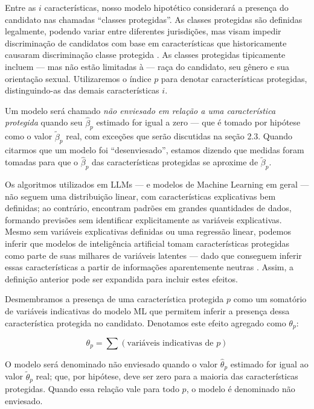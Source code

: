\documentclass[12pt,a4paper]{article}
\begin{document}
Entre as $i$ características, nosso modelo hipotético considerará a
presença do candidato nas chamadas ``classes protegidas''. As classes
protegidas são definidas legalmente, podendo variar entre diferentes
jurisdições, mas visam impedir discriminação de candidatos com base em
características que historicamente causaram discriminação classe
protegida \citep{heymann2020}. As classes protegidas tipicamente
incluem --- mas não estão limitadas à --- raça do candidato, seu gênero
e sua orientação sexual. Utilizaremos o índice $p$ para denotar
características protegidas, distinguindo-as das demais características
$i$.

Um modelo será chamado \textit{não enviesado em relação a uma característica
protegida} quando seu $\hat{\beta}_p$ estimado for igual a zero --- que é tomado
por hipótese como o valor $\tilde{\beta}_p$ real, com exceções que serão discutidas
na seção 2.3. Quando citarmos que um modelo foi ``desenviesado'',
estamos dizendo que medidas foram tomadas para que o $\hat{\beta}_p$ das
características protegidas se aproxime de $\tilde{\beta}_p$.

Os algoritmos utilizados em LLMs --- e modelos de Machine Learning em
geral --- não seguem uma distribuição linear, com características
explicativas bem definidas; ao contrário, encontram padrões em grandes
quantidades de dados, formando previsões sem identificar explicitamente
as variáveis explicativas. Mesmo sem variáveis explicativas definidas ou
uma regressão linear, podemos inferir que modelos de inteligência
artificial tomam características protegidas como parte de suas milhares
de variáveis latentes --- dado que conseguem inferir essas
características a partir de informações aparentemente neutras \citep{bai2024}. Assim, a definição anterior pode ser expandida para incluir
estes efeitos.

Desmembramos a presença de uma característica protegida $p$ como um
somatório de variáveis indicativas do modelo ML que permitem inferir a
presença dessa característica protegida no candidato. Denotamos este
efeito agregado como $\theta_p$:

\begin{equation}
\theta_p = \sum(\text{variáveis indicativas de } p)
\end{equation}

O modelo será denominado não enviesado quando o valor $\hat{\theta}_p$ estimado for
igual ao valor $\tilde{\theta}_p$ real; que, por hipótese, deve ser zero para a
maioria das características protegidas. Quando essa relação vale para
todo $p$, o modelo é denominado não enviesado.
\end{document}
